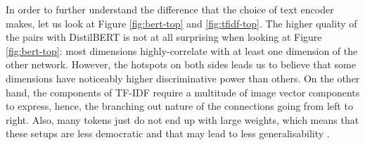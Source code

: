 In order to further understand the difference that the choice of text encoder makes, let us look at Figure \ref{fig:bert-top} and \ref{fig:tfidf-top}. The higher quality of the pairs with DistilBERT is not at all surprising when looking at Figure \ref{fig:bert-top}: most dimensions highly-correlate with at least one dimension of the other network. However, the hotspots on both sides leads us to believe that some dimensions have noticeably higher discriminative power than others. On the other hand, the components of TF-IDF require a multitude of image vector components to express, hence, the branching out nature of the connections going from left to right. Also, many tokens just do not end up with large weights, which means that these setups are less democratic and that may lead to less generalisability \cite{jegou2014triangulation}.

